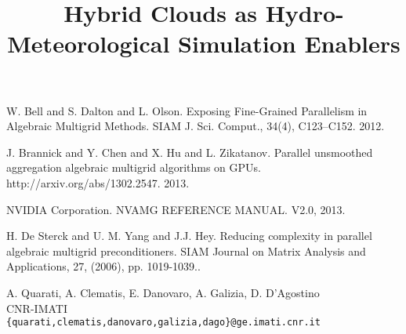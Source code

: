\documentclass[article,A4,11pt]{llncs}%
\begin{document}

\begin{thebibliography}{10}
{\sc W. Bell and S. Dalton and L. Olson}. {Exposing Fine-Grained Parallelism in Algebraic Multigrid Methods}. SIAM J. Sci. Comput., 34(4), C123–C152. 2012.

{\sc J. Brannick and Y. Chen and X. Hu and L. Zikatanov}. {Parallel unsmoothed aggregation algebraic multigrid algorithms on GPUs}. http://arxiv.org/abs/1302.2547. 2013.

{\sc NVIDIA Corporation}. {NVAMG REFERENCE MANUAL}. V2.0, 2013.

{\sc H. De Sterck and U. M. Yang and J.J. Hey}. {Reducing complexity in parallel algebraic multigrid preconditioners}. SIAM Journal on Matrix Analysis and Applications, 27, (2006), pp. 1019-1039..
\end{thebibliography}

\title{Hybrid Clouds as Hydro-Meteorological Simulation Enablers}
 \author{} \institute{}
\maketitle
\begin{center}
{\large A. Quarati, A. Clematis, E. Danovaro,  A. Galizia, D. D'Agostino}\\
CNR-IMATI\\
{\tt \{quarati,clematis,danovaro,galizia,dago\}@ge.imati.cnr.it}
\end{center}
\end{document}

